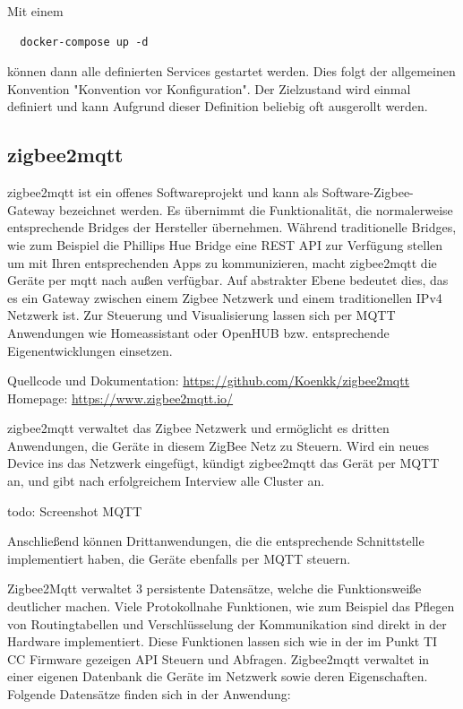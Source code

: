 Mit einem 
\begin{lstlisting}
  docker-compose up -d
\end{lstlisting}

können dann alle definierten Services gestartet werden. Dies folgt der allgemeinen Konvention "Konvention vor Konfiguration". Der Zielzustand wird einmal definiert
und kann Aufgrund dieser Definition beliebig oft ausgerollt werden.

\subsection{zigbee2mqtt}

zigbee2mqtt ist ein offenes Softwareprojekt und kann als \grqq Software-Zigbee-Gateway \grqq bezeichnet werden. Es übernimmt die Funktionalität, die normalerweise entsprechende
\grqq Bridges \grqq der Hersteller übernehmen. Während traditionelle Bridges, wie zum Beispiel die Phillips Hue Bridge eine REST API zur Verfügung stellen um mit Ihren entsprechenden
Apps zu kommunizieren, macht zigbee2mqtt die Geräte per mqtt nach außen verfügbar. Auf abstrakter Ebene bedeutet dies, das es ein Gateway zwischen einem Zigbee Netzwerk und
einem traditionellen IPv4 Netzwerk ist. Zur Steuerung und Visualisierung lassen sich per MQTT Anwendungen wie \grqq Homeassistant \grqq oder \grqq OpenHUB \grqq{} bzw. entsprechende
Eigenentwicklungen einsetzen.

Quellcode und Dokumentation: \url{https://github.com/Koenkk/zigbee2mqtt}
Homepage: \url{https://www.zigbee2mqtt.io/}

zigbee2mqtt verwaltet das Zigbee Netzwerk und ermöglicht es dritten Anwendungen, die Geräte in diesem ZigBee Netz zu Steuern. Wird ein neues Device ins das Netzwerk eingefügt,
kündigt zigbee2mqtt das Gerät per MQTT an, und gibt nach erfolgreichem Interview alle Cluster an.

todo: Screenshot MQTT

Anschließend können Drittanwendungen, die die entsprechende Schnittstelle implementiert haben, die Geräte ebenfalls per MQTT steuern.

Zigbee2Mqtt verwaltet 3 persistente Datensätze, welche die Funktionsweiße deutlicher machen. Viele Protokollnahe Funktionen, wie zum Beispiel das Pflegen von Routingtabellen und
Verschlüsselung der Kommunikation sind direkt in der Hardware implementiert. Diese Funktionen lassen sich wie in der im Punkt TI CC Firmware gezeigen API Steuern und Abfragen.
Zigbee2mqtt verwaltet in einer eigenen Datenbank die Geräte im Netzwerk sowie deren Eigenschaften.
Folgende Datensätze finden sich in der Anwendung:

